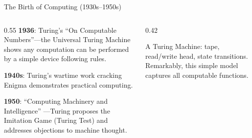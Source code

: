 ﻿\documentclass[aspectratio=169,11pt]{beamer}
\begin{document}
\begin{frame}{The Birth of Computing (1930s--1950s)}
\begin{columns}[T]
\begin{column}{0.55\textwidth}
\textbf{1936}: Turing's ``On Computable Numbers''---the Universal Turing Machine shows any computation can be performed by a simple device following rules.

\vspace{0.2em}
\textbf{1940s}: Turing's wartime work cracking Enigma demonstrates practical computing.

\vspace{0.2em}
\textbf{1950}: ``Computing Machinery and Intelligence'' \parencite{turing_computing_machinery}---Turing proposes the Imitation Game (Turing Test) and addresses objections to machine thought.
\end{column}
\begin{column}{0.42\textwidth}
\begin{center}
\end{center}

\vspace{0.2em}
{\scriptsize A Turing Machine: tape, read/write head, state transitions. Remarkably, this simple model captures all computable functions.}
\end{column}
\end{columns}
\end{frame}
\end{document}
